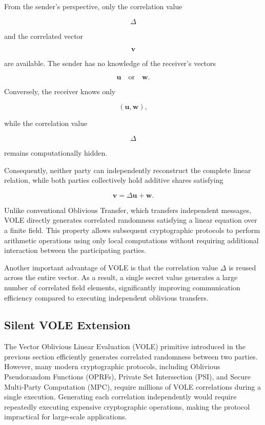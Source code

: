 \documentclass[11pt,a4paper]{article}
\begin{document}
From the sender's perspective, only the correlation value

\[
\Delta
\]

and the correlated vector

\[
\mathbf{v}
\]

are available. The sender has no knowledge of the receiver's vectors

\[
\mathbf{u}
\quad\text{or}\quad
\mathbf{w}.
\]

Conversely, the receiver knows only

\[
(\mathbf{u},\mathbf{w}),
\]

while the correlation value

\[
\Delta
\]

remains computationally hidden.

Consequently, neither party can independently reconstruct the complete linear relation, while both parties collectively hold additive shares satisfying

\[
\mathbf{v}
=
\Delta\mathbf{u}
+
\mathbf{w}.
\]

Unlike conventional Oblivious Transfer, which transfers independent messages, VOLE directly generates correlated randomness satisfying a linear equation over a finite field. This property allows subsequent cryptographic protocols to perform arithmetic operations using only local computations without requiring additional interaction between the participating parties.

Another important advantage of VOLE is that the correlation value $\Delta$ is reused across the entire vector. As a result, a single secret value generates a large number of correlated field elements, significantly improving communication efficiency compared to executing independent oblivious transfers.


\subsection{Silent VOLE Extension}

The Vector Oblivious Linear Evaluation (VOLE) primitive introduced in the
previous section efficiently generates correlated randomness between two
parties. However, many modern cryptographic protocols, including
Oblivious Pseudorandom Functions (OPRFs), Private Set Intersection (PSI),
and Secure Multi-Party Computation (MPC), require millions of VOLE
correlations during a single execution. Generating each correlation
independently would require repeatedly executing expensive cryptographic
operations, making the protocol impractical for large-scale applications.
\end{document}
